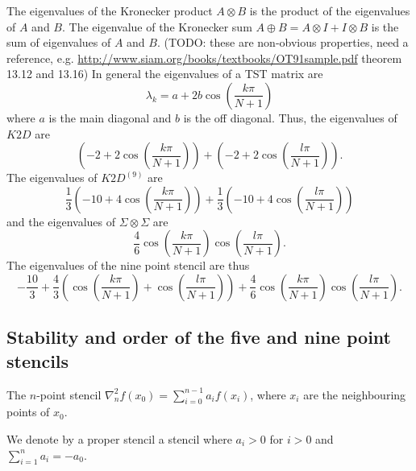 The eigenvalues of the Kronecker product $A \otimes B$ is the product of the eigenvalues of $A$ and $B$.
The eigenvalue of the Kronecker sum $A\oplus B = A \otimes I + I \otimes B$ is the sum of eigenvalues of $A$ and $B$.
(TODO: these are non-obvious properties, need a reference, e.g. \url{http://www.siam.org/books/textbooks/OT91sample.pdf} theorem 13.12 and 13.16)
In general the eigenvalues of a TST matrix are
\begin{equation*}
	\lambda_k = a + 2 b \cos\left(\frac{k \pi}{N + 1}\right)
\end{equation*}
where $a$ is the main diagonal and $b$ is the off diagonal.
Thus, the eigenvalues of $K2D$ are
$$
\left(-2 + 2\cos\left(\frac{k \pi}{N + 1}\right)\right)
+
\left(-2 + 2\cos\left(\frac{l \pi}{N + 1}\right)\right).
$$
The eigenvalues of $K2D^{(9)}$ are
$$
\frac13\left(-10 + 4\cos\left(\frac{k \pi}{N + 1}\right)\right)
+
\frac13\left(-10 + 4\cos\left(\frac{l \pi}{N + 1}\right)\right)
$$
and the eigenvalues of $\Sigma \otimes \Sigma$ are
$$
\frac46
\cos\left(\frac{k \pi}{N+1}\right)
\cos\left(\frac{l \pi}{N+1}\right).
$$
The eigenvalues of the nine point stencil are thus
\begin{equation}
  -\frac{10}{3}
  + \frac43
  \left(
  \cos(\frac{k \pi}{N+1})
  + \cos(\frac{l \pi}{N+1})
  \right)
  +
  \frac46
  \cos(\frac{k \pi}{N+1})
  \cos(\frac{l \pi}{N+1}).
\end{equation}

\newcommand{\inorm}[1]{
\lVert #1 \rVert_\infty
}

\subsection{Stability and order of the five and nine point stencils}
\begin{definition}
  The $n$-point stencil $\nabla_n^2 f(x_0) = \sum_{i=0}^{n-1} a_i f(x_i)$,
  where $x_i$ are the neighbouring points of $x_0$.
\end{definition}

\begin{definition}
  We denote by a proper stencil a stencil where $a_i > 0$ for $i>0$ and $\sum_{i=1}^n a_i = -a_0$.
\end{definition}

